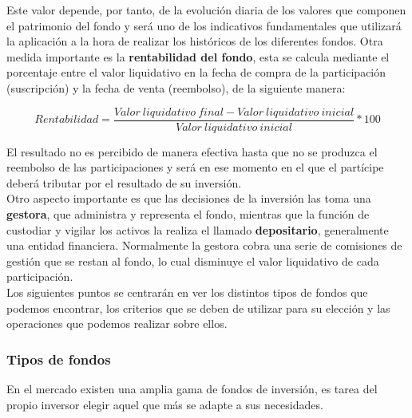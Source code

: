 \documentclass[12pt, a4paper]{article}
\begin{document}
Este valor depende, por tanto, de la evolución diaria de los valores que componen el patrimonio del fondo y será uno de los indicativos fundamentales que utilizará la aplicación a la hora de realizar los históricos de los diferentes fondos. Otra medida importante es la \textbf{rentabilidad del fondo}, esta se calcula mediante el porcentaje entre el valor liquidativo en la fecha de compra de la participación (suscripción) y la fecha de venta (reembolso), de la siguiente manera:

\begin{center}
	\begin{equation}
	Rentabilidad = \frac{ Valor\ liquidativo\ final - Valor\ liquidativo\ inicial}{Valor\ liquidativo\ inicial } * 100
	\end{equation}
\end{center}

\newpage

El resultado no es percibido de manera efectiva hasta que no se produzca el reembolso de las participaciones y será en ese momento en el que el partícipe deberá tributar por el resultado de su inversión. \\


Otro aspecto importante es que las decisiones de la inversión las toma una \textbf{gestora}, que administra y representa el fondo, mientras que la función de custodiar y vigilar los activos la realiza el llamado \textbf{depositario}, generalmente una entidad financiera. Normalmente la gestora cobra una serie de comisiones de gestión que se restan al fondo, lo cual disminuye el valor liquidativo de cada participación.\\

Los siguientes puntos se centrarán en ver los distintos tipos de fondos que podemos encontrar, los criterios que se deben de utilizar para su elección y las operaciones que podemos realizar sobre ellos.


\subsubsection{Tipos de fondos }

En el mercado existen una amplia gama de fondos de inversión, es tarea del propio inversor elegir aquel que más se adapte a sus necesidades.
\end{document}
